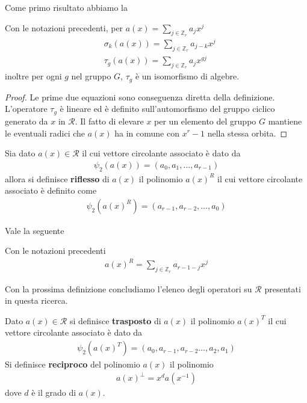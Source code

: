 Come primo risultato abbiamo la 
\begin{prop}
   Con le notazioni precedenti, per $a(x) = \sum_{j \in \mathbb{Z}_{r}} a_{j} x^j$
   \begin{align*}
     & \sigma_{k} (a(x)) = \sum_{j \in \mathbb{Z}_{r}} a_{j-k} x^j \\
     & \tau_{g} (a(x)) = \sum_{j \in \mathbb{Z}_{r}} a_{j}x^{gj}
   \end{align*}
   inoltre per ogni $g$ nel gruppo $G$, $\tau_{g}$ è un isomorfismo di algebre.
\end{prop}
\begin{proof}
   Le prime due equazioni sono conseguenza diretta della definizione. 
   L'operatore $\tau_{g}$ è lineare ed è definito sull'automorfismo del gruppo ciclico generato da $x$ in $\mathcal{R}$. Il fatto di elevare $x$ per un elemento del gruppo $G$ mantiene le eventuali radici che $a(x)$ ha in comune con $x^r - 1$ nella stessa orbita.
\end{proof}
\begin{definizione}
   Sia dato $a(x) \in \mathcal{R}$ il cui vettore circolante associato è dato da 
   \begin{align*}
      \psi_{2}(a(x))=(a_0 , a_1 , \dots, a_{r-1})
   \end{align*}
   allora si definisce {\bf riflesso} di $a(x)$ il polinomio $a(x)^{R}$ il cui vettore circolante associato è definito come 
   \begin{align*}
      \psi_{2}(a(x)^{R})=(a_{r-1} , a_{r-2} , \dots, a_{0})
   \end{align*}
\end{definizione}
\noindent
Vale la seguente
\begin{prop}
   Con le notazioni precedenti
   \begin{align*}
     a(x)^{R}  = \sum_{j \in \mathbb{Z}_{r}} a_{r-1-j}x^{j}
   \end{align*}
\end{prop}
\noindent
Con la prossima definizione concludiamo l'elenco degli operatori su $\mathcal{R}$ presentati in questa ricerca.
\begin{definizione}
   Dato $a(x) \in \mathcal{R}$ si definisce {\bf trasposto} di $a(x)$ il polinomio $a(x)^{T}$ il cui vettore circolante associato è dato da 
   \begin{align*}
   \psi_{2}(a(x)^{T})=(a_{0} , a_{r-1} , a_{r-2} \dots, a_{2}, a_{1})
   \end{align*}
   Si definisce {\bf reciproco} del polinomio $a(x)$ il polinomio 
   \begin{align*}
      a(x)^{\perp} = x^d a(x^{-1})
   \end{align*}
   dove $d$ è il grado di $a(x)$.
\end{definizione}
